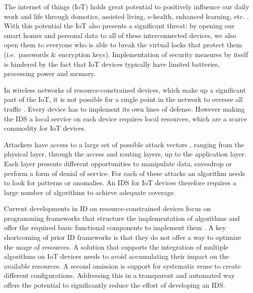 \documentclass[conference]{IEEEtran}
\begin{document}

The internet of things (IoT) holds great potential to positively influence our
daily work and life through domotics, assisted living, e-health, enhanced
learning, etc. \cite{atzori2010internet}. With this potential the IoT also
presents a significant threat: by opening our smart homes and personal data to
all of these interconnected devices, we also open them to everyone who is able
to break the virtual locks that protect them (i.e.\ passwords \& encryption
keys). Implementation of security measures by itself is hindered by the fact
that IoT devices typically have limited batteries, processing power and memory.


In wireless networks of resource-constrained devices, which make up a
significant part of the IoT, it is not possible for a single point in the
network to oversee all traffic \cite{mishra2004intrusion}. Every device has to
implement its own lines of defense. However making the IDS a local service on
each device requires local resources, which are a scarce commodity for IoT
devices.

Attackers have access to a large set of possible attack vectors
\cite{aschenbruck2012security}, ranging from the physical layer, through the
access and routing layers, up to the application layer. Each layer presents
different opportunities to manipulate data, eavesdrop or perform a form of
denial of service. For each of these attacks an algorithm needs to look for
patterns or anomalies. An IDS for IoT devices therefore requires a large number
of algorithms to achieve adequate coverage.


Current developments in ID on resource-constrained devices focus on programming
frameworks that structure the implementation of algorithms \cite{valero2012di}
and offer the required basic functional components to implement them
\cite{krontiris2008lidea}. A key shortcoming of prior ID frameworks is that
they do not offer a way to optimize the usage of resources. A solution that
supports the integration of multiple algorithms on IoT devices needs to avoid
accumulating their impact on the available resources. A second omission is
support for systematic reuse to create different configurations. Addressing
this in a transparent and automated way offers the potential to significantly
reduce the effort of developing an IDS.

\end{document}
